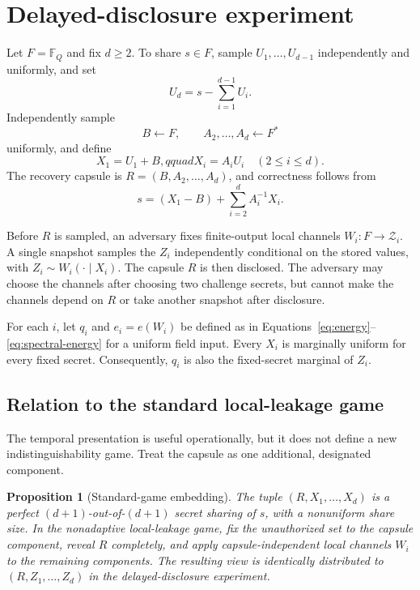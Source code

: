 \documentclass[11pt]{article}
\newtheorem{proposition}[theorem]{Proposition}
\theoremstyle{definition}
\newcommand{\F}{\mathbb{F}}
\begin{document}
\section{Delayed-disclosure experiment}\label{sec:model}

Let $F=\F_Q$ and fix $d\geq2$.  To share $s\in F$, sample
$U_1,\ldots,U_{d-1}$ independently and uniformly, and set
\[
 U_d=s-\sum_{i=1}^{d-1}U_i.
\]
Independently sample
\[
 B\leftarrow F,\qquad A_2,\ldots,A_d\leftarrow F^{*}
\]
uniformly, and define
\begin{equation}\label{eq:encoding}
 X_1=U_1+B,qquad X_i=A_iU_i\quad(2\leq i\leq d).
\end{equation}
The recovery capsule is $R=(B,A_2,\ldots,A_d)$, and correctness follows from
\begin{equation}\label{eq:reconstruct}
 s=(X_1-B)+\sum_{i=2}^{d}A_i^{-1}X_i.
\end{equation}

Before $R$ is sampled, an adversary fixes finite-output local channels
$W_i:F\to\mathcal Z_i$.  A single snapshot samples the $Z_i$ independently
conditional on the stored values, with $Z_i\sim W_i(\cdot\mid X_i)$.  The
capsule $R$ is then disclosed.  The adversary may choose the channels after
choosing two challenge secrets, but cannot make the channels depend on $R$ or
take another snapshot after disclosure.

For each $i$, let $q_i$ and $e_i=e(W_i)$ be defined as in
Equations~\eqref{eq:energy}--\eqref{eq:spectral-energy} for a uniform field
input.  Every $X_i$ is marginally uniform for every fixed secret.  Consequently,
$q_i$ is also the fixed-secret marginal of $Z_i$.

\subsection{Relation to the standard local-leakage game}

The temporal presentation is useful operationally, but it does not define a new
indistinguishability game.  Treat the capsule as one additional, designated
component.

\begin{proposition}[Standard-game embedding]\label{prop:embedding}
The tuple $(R,X_1,\ldots,X_d)$ is a perfect $(d+1)$-out-of-$(d+1)$ secret
sharing of $s$, with a nonuniform share size.  In the nonadaptive local-leakage
game, fix the unauthorized set to the capsule component, reveal $R$ completely,
and apply capsule-independent local channels $W_i$ to the remaining components.
The resulting view is identically distributed to $(R,Z_1,\ldots,Z_d)$ in the
delayed-disclosure experiment.
\end{proposition}
\end{document}
